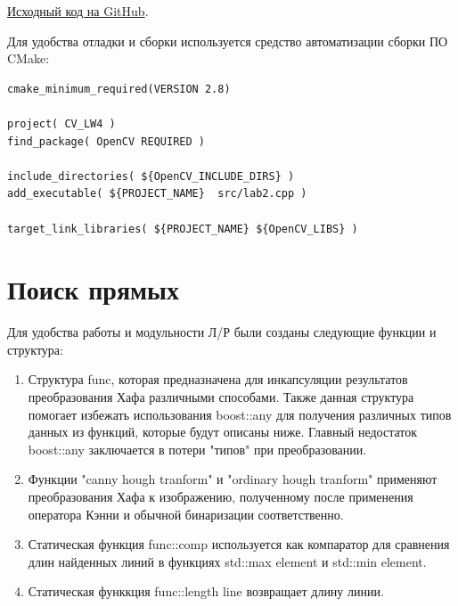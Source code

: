 \href{https://github.com/mfclabber/itmo-cv-labs/tree/main/lab5}{Исходный код на GitHub}. 

Для удобства отладки и сборки используется средство автоматизации сборки ПО CMake:
\begin{lstlisting}[style=cpp_white, caption={CMakeLists.txt для сборки проекта}]
cmake_minimum_required(VERSION 2.8)

project( CV_LW4 )
find_package( OpenCV REQUIRED )

include_directories( ${OpenCV_INCLUDE_DIRS} )
add_executable( ${PROJECT_NAME}  src/lab2.cpp )

target_link_libraries( ${PROJECT_NAME} ${OpenCV_LIBS} )
\end{lstlisting}

\section{Поиск прямых}

Для удобства работы и модульности Л/Р были созданы следующие функции и структура:

\begin{enumerate}
\item Структура func, которая предназначена для инкапсуляции результатов преобразования Хафа различными способами.
Также данная структура помогает избежать использования boost::any для получения различных типов данных из функций, которые будут описаны ниже. 
Главный недостаток boost::any заключается в потери "типов" при преобразовании.
\item Функции "canny hough tranform" и "ordinary hough tranform" применяют преобразования Хафа к изображению, полученному после применения оператора Кэнни и обычной бинаризации соответственно.
\item Статическая функция func::comp используется как компаратор для сравнения длин найденных линий в функциях std::max element и std::min element.
\item Статическая функкция func::length line возвращает длину линии.
\end{enumerate}

